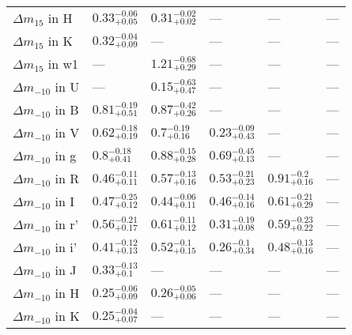 \begin{longtable}{llllll}
${\Delta m}_{15}$ in H   &  $0.33^{-0.06}_{+0.05}$ &  $0.31^{-0.02}_{+0.02}$ &                     --- &                     --- &                     --- \\
${\Delta m}_{15}$ in K   &  $0.32^{-0.04}_{+0.09}$ &                     --- &                     --- &                     --- &                     --- \\
${\Delta m}_{15}$ in w1  &                     --- &  $1.21^{-0.68}_{+0.29}$ &                     --- &                     --- &                     --- \\
${\Delta m}_{-10}$ in U  &                     --- &  $0.15^{-0.63}_{+0.47}$ &                     --- &                     --- &                     --- \\
${\Delta m}_{-10}$ in B  &  $0.81^{-0.19}_{+0.51}$ &  $0.87^{-0.42}_{+0.26}$ &                     --- &                     --- &                     --- \\
${\Delta m}_{-10}$ in V  &  $0.62^{-0.18}_{+0.19}$ &   $0.7^{-0.19}_{+0.16}$ &  $0.23^{-0.09}_{+0.43}$ &                     --- &                     --- \\
${\Delta m}_{-10}$ in g  &   $0.8^{-0.18}_{+0.41}$ &  $0.88^{-0.15}_{+0.28}$ &  $0.69^{-0.45}_{+0.13}$ &                     --- &                     --- \\
${\Delta m}_{-10}$ in R  &  $0.46^{-0.11}_{+0.11}$ &  $0.57^{-0.13}_{+0.16}$ &  $0.53^{-0.21}_{+0.23}$ &   $0.91^{-0.2}_{+0.16}$ &                     --- \\
${\Delta m}_{-10}$ in I  &  $0.47^{-0.25}_{+0.12}$ &  $0.44^{-0.06}_{+0.11}$ &  $0.46^{-0.14}_{+0.16}$ &  $0.61^{-0.21}_{+0.29}$ &                     --- \\
${\Delta m}_{-10}$ in r' &  $0.56^{-0.21}_{+0.17}$ &  $0.61^{-0.11}_{+0.12}$ &  $0.31^{-0.19}_{+0.08}$ &  $0.59^{-0.23}_{+0.22}$ &                     --- \\
${\Delta m}_{-10}$ in i' &  $0.41^{-0.12}_{+0.13}$ &   $0.52^{-0.1}_{+0.15}$ &   $0.26^{-0.1}_{+0.34}$ &  $0.48^{-0.13}_{+0.16}$ &                     --- \\
${\Delta m}_{-10}$ in J  &   $0.33^{-0.13}_{+0.1}$ &                     --- &                     --- &                     --- &                     --- \\
${\Delta m}_{-10}$ in H  &  $0.25^{-0.06}_{+0.09}$ &  $0.26^{-0.05}_{+0.06}$ &                     --- &                     --- &                     --- \\
${\Delta m}_{-10}$ in K  &  $0.25^{-0.04}_{+0.07}$ &                     --- &                     --- &                     --- &                     --- \\

\end{longtable}
